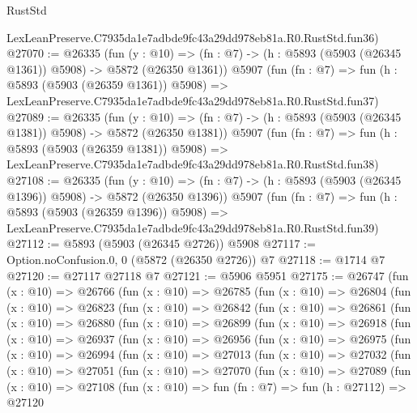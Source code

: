 \begin{lexlean}{RustStd}
\begin{coremodule}
    LexLeanPreserve.C7935da1e7adbde9fc43a29dd978eb81a.R0.RustStd.fun36)
@27070 := @26335
    (fun (y : @10) => (fn : @7) -> (h : @5893 (@5903 (@26345 @1361)) @5908) -> @5872 (@26350 @1361))
    @5907
    (fun (fn : @7) =>
    fun (h : @5893 (@5903 (@26359 @1361)) @5908) =>
    LexLeanPreserve.C7935da1e7adbde9fc43a29dd978eb81a.R0.RustStd.fun37)
@27089 := @26335
    (fun (y : @10) => (fn : @7) -> (h : @5893 (@5903 (@26345 @1381)) @5908) -> @5872 (@26350 @1381))
    @5907
    (fun (fn : @7) =>
    fun (h : @5893 (@5903 (@26359 @1381)) @5908) =>
    LexLeanPreserve.C7935da1e7adbde9fc43a29dd978eb81a.R0.RustStd.fun38)
@27108 := @26335
    (fun (y : @10) => (fn : @7) -> (h : @5893 (@5903 (@26345 @1396)) @5908) -> @5872 (@26350 @1396))
    @5907
    (fun (fn : @7) =>
    fun (h : @5893 (@5903 (@26359 @1396)) @5908) =>
    LexLeanPreserve.C7935da1e7adbde9fc43a29dd978eb81a.R0.RustStd.fun39)
@27112 := @5893 (@5903 (@26345 @2726)) @5908
@27117 := Option.noConfusion.{0, 0} (@5872 (@26350 @2726)) @7
@27118 := @1714 @7
@27120 := @27117 @27118 @7
@27121 := @5906 @5951
@27175 := @26747
    (fun (x : @10) =>
    @26766
      (fun (x : @10) =>
      @26785
        (fun (x : @10) =>
        @26804
          (fun (x : @10) =>
          @26823
            (fun (x : @10) =>
            @26842
              (fun (x : @10) =>
              @26861
                (fun (x : @10) =>
                @26880
                  (fun (x : @10) =>
                  @26899
                    (fun (x : @10) =>
                    @26918
                      (fun (x : @10) =>
                      @26937
                        (fun (x : @10) =>
                        @26956
                          (fun (x : @10) =>
                          @26975
                            (fun (x : @10) =>
                            @26994
                              (fun (x : @10) =>
                              @27013
                                (fun (x : @10) =>
                                @27032
                                  (fun (x : @10) =>
                                  @27051
                                    (fun (x : @10) =>
                                    @27070
                                      (fun (x : @10) =>
                                      @27089
                                        (fun (x : @10) =>
                                        @27108
                                          (fun (x : @10) =>
                                          fun (fn : @7) =>
                                          fun (h : @27112) =>
                                          @27120

\end{coremodule}
\end{lexlean}
